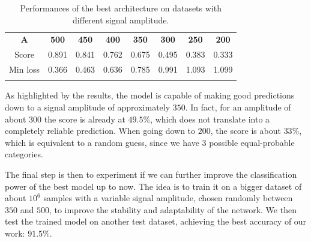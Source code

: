 \documentclass[prl,twocolumn]{revtex4-1}
\begin{document}
\begin{table}[!h]
    \begin{center}
        \begin{tabular}{c|ccccccc}
            \toprule
            {\small $\mathbf{A}$}   & {\small\bf 500}       & {\small\bf 450}       & {\small\bf 400}       & {\small\bf 350}       & {\small\bf 300}       & {\small\bf 250}       & {\small\bf 200}       \\
            \colrule
            Score           & {\scriptsize 0.891}   & {\scriptsize 0.841}   & {\scriptsize 0.762}   & {\scriptsize 0.675}   & {\scriptsize 0.495}   & {\scriptsize 0.383}   & {\scriptsize 0.333}   \\
            Min loss        & {\scriptsize 0.366}   & {\scriptsize 0.463}   & {\scriptsize 0.636}   & {\scriptsize  0.785}  & {\scriptsize 0.991}   & {\scriptsize  1.093 } & {\scriptsize 1.099 }  \\
        \botrule
        \end{tabular}
    \end{center}
    \caption{Performances of the best architecture on datasets with different signal amplitude.}
    \label{tab:ratio}
\end{table}

As highlighted by the results, the model is capable of making good predictions down to a signal amplitude of approximately $350$.
In fact, for an amplitude of about $300$ the score is already at $49.5\%$, which does not translate into a completely reliable prediction. When going down to $200$, the score is about $33\%$, which is equivalent to a random guess, since we have $3$ possible equal-probable categories.

The final step is then to experiment if we can further improve the classification power of the best model up to now. The idea is to train it on a bigger dataset of about $10^{6}$ samples with a variable signal amplitude, chosen randomly between $350$ and $500$, to improve the stability and adaptability of the network. We then test the trained model on another test dataset, achieving the best accuracy of our work: $91.5\%$.

\end{document}
